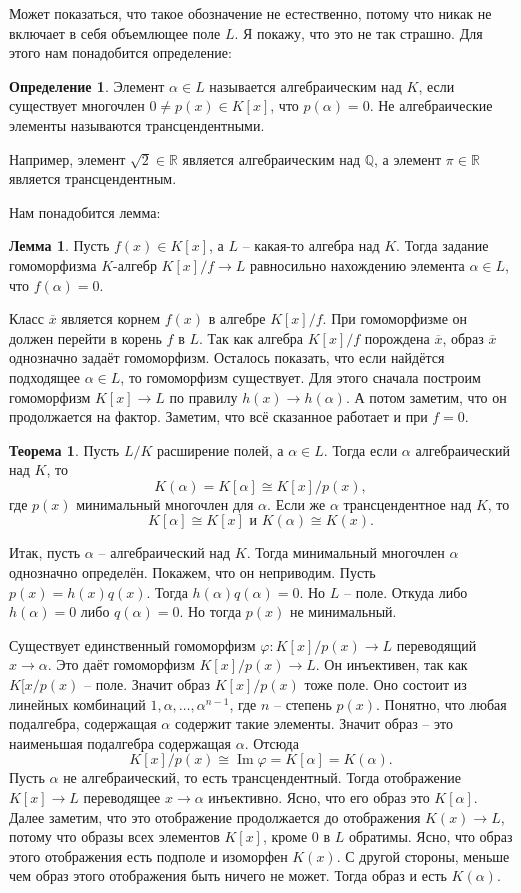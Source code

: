 \documentclass[12pt,a4paper,oneside]{book}
\theoremstyle{definition}
\newtheorem*{defn}{\color{yellow!30!red} Определение}
\newtheorem{thm}{\color{red!40!black}Теорема}
\newtheorem{lem}{\color{green!50!black}Лемма}
\newcommand{\ovl}{\overline}
\newcommand{\im}{\operatorname{Im}}
\newcommand{\R}{\mathbb R}
\newcommand{\Q}{\mathbb Q}
\def\ffi{\varphi}
\def\thrm{\begin{thm}}
\def\ethrm{\end{thm}}
\def\dfn{\begin{defn}}
\def\edfn{\end{defn}}
\def\lm{\begin{lem}}
\def\elm{\end{lem}}
\begin{document}
Может показаться, что такое обозначение не естественно, потому что никак не включает в себя объемлющее поле $L$. Я покажу, что это не так страшно. Для этого нам понадобится определение:

\dfn Элемент $\alpha \in L$ называется алгебраическим над $K$, если существует многочлен $0\neq p(x)\in K[x]$, что $p(\alpha)=0$. Не алгебраические элементы называются трансцендентными.
\edfn 

Например, элемент $\sqrt{2} \in \R$ является алгебраическим над $\Q$, а элемент $\pi\in \R$ является трансцендентным.

Нам понадобится лемма:

\lm Пусть $f(x) \in K[x]$, а $L$ -- какая-то алгебра над $K$. Тогда задание  гомоморфизма $K$-алгебр $K[x]/f \to L$ равносильно нахождению элемента $\alpha \in L$, что $f(\alpha)=0$.
\elm
\proof Класс $\ovl{x}$ является корнем $f(x)$ в алгебре $K[x]/f$. При гомоморфизме он должен перейти в корень $f$ в $L$. Так как алгебра $K[x]/f$ порождена $\ovl{x}$, образ $\ovl{x}$ однозначно задаёт гомоморфизм. 
Осталось показать, что если найдётся подходящее $\alpha\in L$, то гомоморфизм существует. Для этого сначала построим гомоморфизм $K[x] \to L$ по правилу $h(x) \to h(\alpha)$. А потом заметим, что он продолжается на фактор. Заметим, что всё сказанное работает и при $f=0$.
\endproof


\thrm Пусть $L/K$ расширение полей, а $\alpha \in L$. Тогда если $\alpha$ алгебраический над $K$, то 
$$K(\alpha)=K[\alpha]\cong K[x]/p(x),$$
 где $p(x)$ минимальный многочлен для $\alpha.$
Если же $\alpha$ трансцендентное над $K$, то $$K[\alpha]\cong K[x] \text{ и } K(\alpha) \cong K(x).$$
\ethrm


\proof Итак, пусть $\alpha$ -- алгебраический над $ K$. Тогда минимальный многочлен $\alpha$ однозначно определён. Покажем, что он неприводим. Пусть $p(x)=h(x)q(x)$. Тогда $h(\alpha)q(\alpha)=0$. Но $L$ -- поле. Откуда либо $h(\alpha)=0$ либо $q(\alpha)=0$. Но тогда $p(x)$ не минимальный.

Существует единственный гомоморфизм $\ffi \colon K[x]/p(x) \to L$ переводящий $x \to \alpha$.  Это даёт гомоморфизм $K[x]/p(x) \to L$. Он инъективен, так как $K[x/p(x)$ -- поле. Значит  образ $K[x]/p(x)$ тоже поле. Оно состоит из линейных комбинаций $1,\alpha,\dots,\alpha^{n-1}$, где $n$ -- степень $p(x)$. Понятно, что любая подалгебра, содержащая $\alpha$ содержит такие элементы. Значит образ -- это наименьшая подалгебра содержащая $\alpha$. Отсюда
$$K[x]/p(x) \cong \im \ffi = K[\alpha]=K(\alpha).$$
Пусть $\alpha$ не алгебраический, то есть трансцендентный. Тогда отображение $K[x] \to L$ переводящее $x\to\alpha$ инъективно. Ясно, что его образ это $K[\alpha]$. Далее заметим, что это отображение продолжается до отображения $K(x) \to L$, потому что образы всех элементов $K[x]$, кроме 0 в $L$ обратимы. Ясно, что образ этого отображения есть подполе и изоморфен $K(x)$. С другой стороны, меньше чем образ этого отображения быть ничего не может. Тогда образ и есть $K(\alpha)$. 
\endproof
\end{document}
